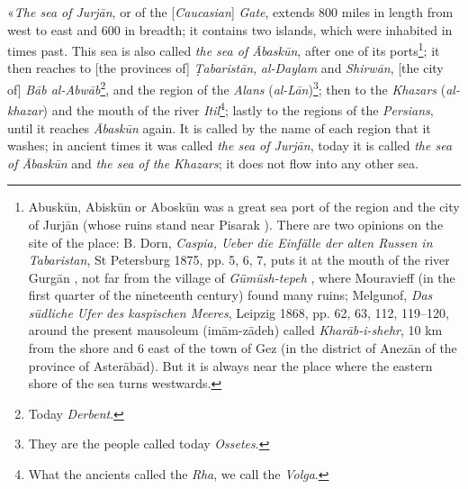 \documentclass[11pt]{article}
\begin{document}
\par «\emph{The sea of Jurjān}, or of the [\emph{Caucasian}] \emph{Gate}, extends 800 miles in length from west to east and 600 in breadth; it contains two islands, which were inhabited in times past. This sea is also called \emph{the sea of Ābaskūn}, after one of its ports\footnote{Abuskūn, Abiskūn or Aboskūn was a great sea port of the region and the city of Jurjān (whose ruins stand near Pisarak ). There are two opinions on the site of the place: B. Dorn, \emph{Caspia, Ueber die Einfälle der alten Russen in Tabaristan}, St Petersburg 1875, pp. 5, 6, 7, puts it at the mouth of the river Gurgān , not far from the village of \emph{Gümüsh-tepeh} , where Mouravieff (in the first quarter of the nineteenth century) found many ruins; Melgunof, \emph{Das südliche Ufer des kaspischen Meeres}, Leipzig 1868, pp. 62, 63, 112, 119–120, around the present mausoleum (imām-zādeh) called \emph{Kharāb-i-shehr}, 10 km from the shore and 6 east of the town of Gez  (in the district of Anezān of the province of Asterābād). But it is always near the place where the eastern shore of the sea turns westwards.}; it then reaches to [the provinces of] \emph{Ṭabaristān}, \emph{al-Daylam} and \emph{Shirwān}, [the city of] \emph{Bāb al-Abwāb}\footnote{Today \emph{Derbent}.}, and the region of the \emph{Alans} (\emph{al-Lān})\footnote{They are the people called today \emph{Ossetes}.}; then to the \emph{Khazars} (\emph{al-khazar}) and the mouth of the river \emph{Itil}\footnote{What the ancients called the \emph{Rha}, we call the \emph{Volga}.}; lastly to the regions of the \emph{Persians}, until it reaches \emph{Ābaskūn} again. It is called by the name of each region that it washes; in ancient times it was called \emph{the sea of Jurjān}, today it is called \emph{the sea of Ābaskūn} and \emph{the sea of the Khazars}; it does not flow into any other sea.\par
\end{document}
